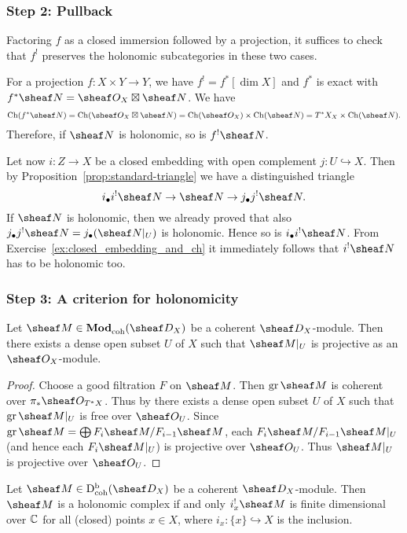 \documentclass[number-in-sections,a4paper]{notes}
\begin{document}
\subsubsection*{Step 2: Pullback}

Factoring $f$ as a closed immersion followed by a projection, it suffices to check that $f^!$ preserves the holonomic subcategories in these two cases.

For a projection $f\colon X \times Y \to Y$, we have $f^! = f^*[\dim X]$ and $f^*$ is exact with $f^*\sheaf N = \sO_X \boxtimes \sheaf N$.
We have
\[
    \Ch(f^*\sheaf N) = \Ch(\sO_X \boxtimes \sheaf N) = \Ch(\sO_X) \times \Ch(\sheaf N) = T^*X_X \times \Ch(\sheaf N).
\]
Therefore, if $\sheaf N$ is holonomic, so is $f^!\sheaf N$.

Let now $i\colon Z \to X$ be a closed embedding with open complement $j\colon U \hookrightarrow X$.
Then by Proposition~\ref{prop:standard-triangle} we have a distinguished triangle
\[
    i_\bullet i^! \sheaf N \to \sheaf N \to j_\bullet j^!\sheaf N.
\]
If $\sheaf N$ is holonomic, then we already proved that also $j_\bullet j^!\sheaf N = j_\bullet(\res{\sheaf N}{U})$ is holonomic.
Hence so is $i_\bullet i^! \sheaf N$.
From Exercise~\ref{ex:closed_embedding_and_ch} it immediately follows that $i^!\sheaf N$ has to be holonomic too.

\subsubsection*{Step 3: A criterion for holonomicity}

\begin{Lemma}
    Let $\sheaf M \in \catDModcoh{X}$ be a coherent $\sD_X$-module.
    Then there exists a dense open subset $U$ of $X$ such that $\res{\sheaf M}{U}$ is projective as an $\sO_X$-module.
\end{Lemma}

\begin{proof}
    Choose a good filtration $F$ on $\sheaf M$.
    Then $\gr \sheaf M$ is coherent over $\pi_*\sO_{T^*X}$.
    Thus by \cite[Lemma~6.9.2]{EGA4.2} there exists a dense open subset $U$ of $X$ such that $\res{\gr \sheaf M}U$ is free over $\sO_U$.
    Since $\gr\sheaf M = \bigoplus F_i\sheaf M/F_{i-1}\sheaf M$, each $\res{F_i\sheaf M/F_{i-1}\sheaf M}U$ (and hence each $\res{F_i\sheaf M}U$) is projective over $\sO_U$.
    Thus $\res{\sheaf M}U$ is projective over $\sO_U$.
\end{proof}

\begin{Proposition}\label{prop:local_hol_criterion}
    Let $\sheaf M \in \catDbDModcoh{X}$ be a coherent $\sD_X$-module.
    Then $\sheaf M$ is a holonomic complex if and only $i_x^!\sheaf M$ is finite dimensional over ${\mathbb{C}}$ for all (closed) points $x \in X$, where $i_x\colon \{x\} \hookrightarrow X$ is the inclusion.
\end{Proposition}
\end{document}
